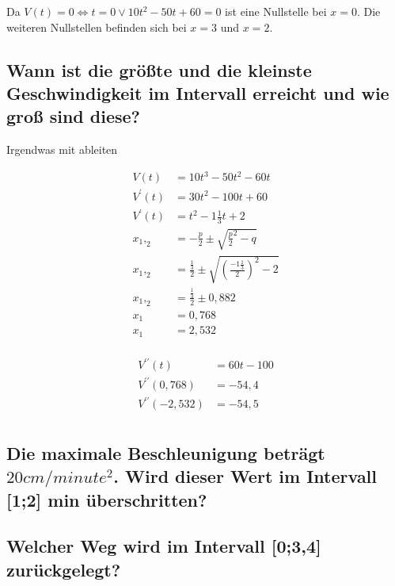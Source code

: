 \documentclass[a4paper,11pt]{scrartcl}
\begin{document}
Da $V(t) = 0 \Leftrightarrow t = 0 \vee 10t^2 - 50t + 60 = 0$ ist eine
Nullstelle bei $x = 0$. Die weiteren Nullstellen befinden sich bei $x = 3$ und
$x = 2$.

\subsection{Wann ist die größte und die kleinste Geschwindigkeit im Intervall
erreicht und wie groß sind diese?}

\begin{outline}
  \1 Irgendwas mit ableiten
\end{outline}

\begin{align*}
  V(t) &= 10t^3 - 50t^2 - 60t                               \\
  V^\prime(t) &= 30t^2 - 100t + 60  \\
  V^\prime(t) &= t^2  - 1\frac{1}{3}t + 2  \\
  x_1,_2 &= -\frac{p}{2} \pm \sqrt{\frac{p}{2}^2 - q} \\
  x_1,_2 &= \frac{\frac{1}{3}}{2} \pm \sqrt{\left(\frac{-1\frac{1}{3}}{2}\right)^2 - 2} \\
  x_1,_2 &= \frac{\frac{1}{3}}{2} \pm 0,882 \\
  x_1   &= 0,768  \\
  x_1   &= 2,532  \\
\end{align*}

\begin{align*}
  V^{\prime\prime}(t) &= 60t - 100  \\
  V^{\prime\prime}(0,768) &= -54,4  \\
  V^{\prime\prime}(-2,532) &= -54,5 \\
\end{align*}

\subsection{Die maximale Beschleunigung beträgt $20cm / minute^2$. Wird dieser
Wert im Intervall [1;2] min überschritten?}

\subsection{Welcher Weg wird im Intervall [0;3,4] zurückgelegt?}
\end{document}
